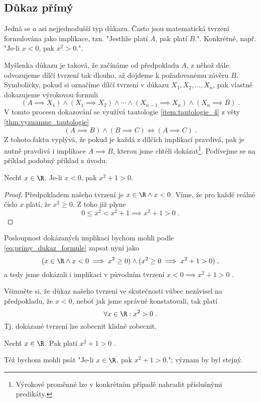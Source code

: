 \subsection{Důkaz přímý}\label{subsec:dukaz_primy}
Jedná se o asi nejjednodušší typ důkazu. Často jsou matematická tvrzení formulována jako implikace, tzn. "Jestliže platí $A$, pak platí $B$.". Konkrétně, např. "Je-li $x<0$, pak $x^2>0$.".\par
Myšlenka důkazu je taková, že začínáme od předpokladu $A$, z něhož dále odvozujeme dílčí tvrzení tak dlouho, až dojdeme k požadovanému závěru $B$. Symbolicky, pokud si označíme dílčí tvrzení v důkazu $X_1, X_2, \ldots, X_n$, pak vlastně dokazujeme výrokovou formuli
\begin{equation}\label{eq:primy_dukaz_formule}
    (A \implies X_1) \land (X_1 \implies X_2) \land \cdots \land (X_{n-1}\implies X_n) \land (X_n \implies B)\; .
\end{equation}
V tomto procesu dokazování se využívá tautologie \ref{item:tautologie_4} z věty \ref{thm:vyznamne_tautologie}
\begin{equation*}
    (A \implies B) \land (B \implies C) \iff (A \implies C)\; .
\end{equation*}
Z tohoto faktu vyplývá, že pokud je každá z dílčích implikací pravdivá, pak je nutně pravdivá i implikace $A \implies B$, kterou jsme chtěli dokázat\footnote{Výrokové proměnné lze v konkrétním případě nahradit příslušnými predikáty.}. Podívejme se na příklad podobný příklad z úvodu.

\begin{assertion}
    Nechť $x\in\R$. Je-li $x<0$, pak $x^2+1>0$.
\end{assertion}
\begin{proof}
    Předpokladem našeho tvrzení je $x\in\R \land x<0$. Víme, že pro každé reálné číslo $x$ platí, že $x^2\geq 0$. Z toho již plyne
    \begin{equation*}
        0 \leq x^2 < x^2+1 \implies x^2+1>0\; .
    \end{equation*}
\end{proof}
Posloupnost dokázaných implikací bychom mohli podle \eqref{eq:primy_dukaz_formule} zapsat nyní jako
\begin{equation*}
    (x\in\R \land x<0 \implies x^2\geq 0) \land (x^2\geq 0 \implies x^2+1>0)\; ,
\end{equation*}
a tedy jsme dokázali i implikaci v původním tvrzení $x<0 \implies x^2+1>0$ .

Všimněte si, že důkaz našeho tvrzení ve skutečnosti vůbec nezávisel na předpokladu, že $x<0$, neboť jak jsme správně konstatovali, tak platí
\begin{equation*}
    \forall x\in\R : x^2>0\; .
\end{equation*}
Tj. dokázané tvrzení lze zobecnit klidně zobecnit.
\begin{assertion*}
    Nechť $x\in\R$. Pak platí $x^2+1>0$ .
\end{assertion*}
\begin{remark}
    Též bychom mohli psát "Je-li $x\in\R$, pak $x^2+1>0$."; význam by byl stejný.
\end{remark}

